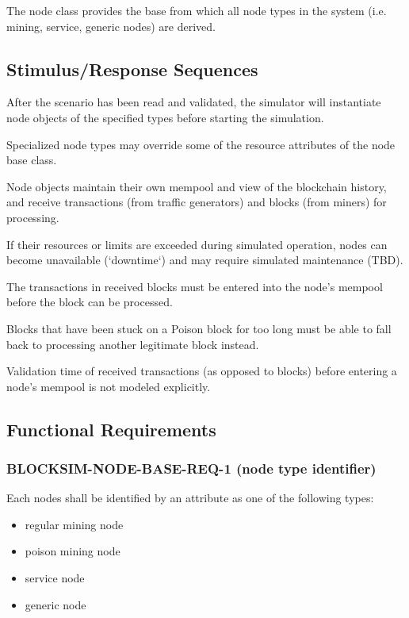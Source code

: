 \documentclass{scrreprt}
\begin{document}
The node class provides the base from which all node types in the
system (i.e. mining, service, generic nodes) are derived.


\subsection{Stimulus/Response Sequences}

After the scenario has been read and validated, the simulator will
instantiate node objects of the specified types before starting the
simulation.

Specialized node types may override some of the resource attributes
of the node base class.

Node objects maintain their own mempool and view of the blockchain history,
and receive transactions (from traffic generators) and blocks (from miners)
for processing.

If their resources or limits are exceeded during simulated operation, nodes
can become unavailable (`downtime`) and may require simulated maintenance (TBD).

The transactions in received blocks must be entered into the node's mempool
before the block can be processed.

Blocks that have been stuck on a Poison block for too long must be able to
fall back to processing another legitimate block instead.

Validation time of received transactions (as opposed to blocks) before
entering a node's mempool is not modeled explicitly.

\subsection{Functional Requirements}

\subsubsection{BLOCKSIM-NODE-BASE-REQ-1 (node type identifier)}

Each nodes shall be identified by an attribute as one of the following types:

\begin{itemize}
   \item regular mining node
   \item poison mining node
   \item service node
   \item generic node
\end{itemize}
\end{document}
